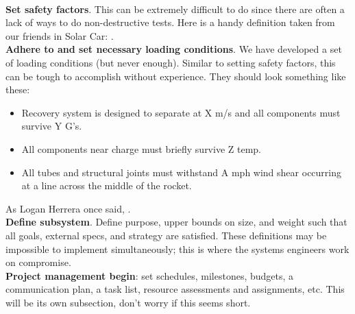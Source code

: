 \\

\textbf{Set safety factors}. This can be extremely difficult to do since there are often a lack of ways to do non-destructive tests. Here is a handy definition taken from our friends in Solar Car: .  \\

\textbf{Adhere to and set necessary loading conditions}. We have developed a set of loading conditions (but never enough). Similar to setting safety factors, this can be tough to accomplish without experience. They should look something like these:
\begin{itemize}
\item Recovery system is designed to separate at X m/s and all components must survive Y G's.
\item All components near charge must briefly survive Z temp.
\item All tubes and structural joints must withstand A mph wind shear occurring at a line across the middle of the rocket.
\end{itemize}
As Logan Herrera once said, . \\

\textbf{Define subsystem}. Define purpose, upper bounds on size, and weight such that all goals, external specs, and strategy are satisfied. These definitions may be impossible to implement simultaneously; this is where the systems engineers work on compromise.  \\

\textbf{Project management begin}: set schedules, milestones, budgets, a communication plan, a task list, resource assessments and assignments, etc. This will be its own subsection, don't worry if this seems short.\\  

